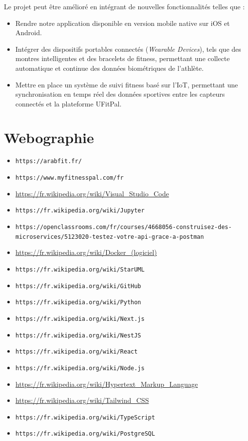 ﻿\documentclass[a4paper,12pt]{report}
\begin{document}
Le projet peut être amélioré en intégrant de nouvelles fonctionnalités telles que :

\begin{itemize}[label=]
    \item Rendre notre application disponible en version mobile native sur iOS et Android.
    \item Intégrer des dispositifs portables connectés (\textit{Wearable Devices}), tels que des montres intelligentes et des bracelets de fitness, permettant une collecte automatique et continue des données biométriques de l'athlète.
    \item Mettre en place un système de suivi fitness basé sur l'IoT, permettant une synchronisation en temps réel des données sportives entre les capteurs connectés et la plateforme UFitPal.
\end{itemize}
\chapter*{Webographie}
\thispagestyle{empty}

\begin{itemize}
    \item [0] \texttt{https://arabfit.fr/}
    \item [1] \texttt{https://www.myfitnesspal.com/fr}
    \item [2] \url{https://fr.wikipedia.org/wiki/Visual_Studio_Code}
    \item [3] \texttt{https://fr.wikipedia.org/wiki/Jupyter}
    \item [4] \texttt{https://openclassrooms.com/fr/courses/4668056-construisez-des-microservices/5123020-testez-votre-api-grace-a-postman}
    \item [5] \url{https://fr.wikipedia.org/wiki/Docker_(logiciel)}
    \item [6] \texttt{https://fr.wikipedia.org/wiki/StarUML }
    \item [7] \texttt{https://fr.wikipedia.org/wiki/GitHub}
    \item [8] \texttt{https://fr.wikipedia.org/wiki/Python}
    \item [9]  \texttt{https://fr.wikipedia.org/wiki/Next.js}
    \item [10] \texttt{https://fr.wikipedia.org/wiki/NestJS}
    \item [11] \texttt{https://fr.wikipedia.org/wiki/React}
    \item [12] \texttt{https://fr.wikipedia.org/wiki/Node.js}
    \item [13] \url{https://fr.wikipedia.org/wiki/Hypertext_Markup_Language }
    \item [14] \url{https://fr.wikipedia.org/wiki/Tailwind_CSS}
    \item [15] \texttt{https://fr.wikipedia.org/wiki/TypeScript }
    \item [16] \texttt{https://fr.wikipedia.org/wiki/PostgreSQL}
    
\end{itemize}
\end{document}

